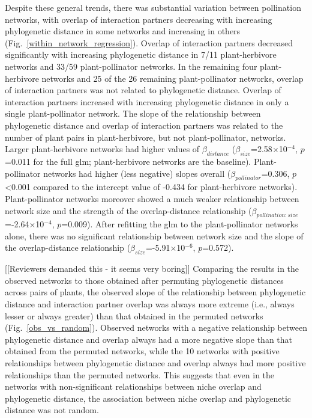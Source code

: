 \documentclass[12pt]{article}
\begin{document}
\begin{spacing}{1.5}
    Despite these general trends, there was substantial variation between 
    pollination networks, with overlap of interaction partners decreasing 
    with increasing phylogenetic distance in some networks and increasing in 
    others (Fig.~\ref{within_network_regression}). Overlap of interaction partners decreased significantly with increasing phylogenetic distance in 7/11 plant-herbivore networks and 33/59 plant-pollinator networks. In the remaining four plant-herbivore networks and 25 of the 26 remaining plant-pollinator networks, overlap of interaction partners was not related to phylogenetic distance. Overlap of interaction partners increased with increasing phylogenetic distance in only a single plant-pollinator network.%
    The slope of the relationship between phylogenetic distance and overlap of interaction partners was related to the number of plant pairs in plant-herbivore, but not plant-pollinator, networks. Larger plant-herbivore networks had higher values of $\beta_{distance}$ ($\beta_{size}$=2.58$\times$10$^{-4}$, $p$=0.011 for the full glm; plant-herbivore networks are the baseline). Plant-pollinator networks had higher (less negative) slopes overall ($\beta_{pollinator}$=0.306, $p$\textless0.001 compared to the intercept value of -0.434 for plant-herbivore networks). Plant-pollinator networks moreover showed a much weaker relationship between network size and the strength of the overlap-distance relationship ($\beta_{pollination:size}$=-2.64$\times$10$^{-4}$, $p$=0.009). After refitting the glm to the plant-pollinator networks alone, there was no significant relationship between network size and the slope of the overlap-distance relationship ($\beta_{size}$=-5.91$\times$10$^{-6}$, $p$=0.572).


    [[Reviewers demanded this - it seems very boring]]
    Comparing the results in the observed networks to those obtained after permuting phylogenetic distances across pairs of plants, the observed slope of the relationship between phylogenetic distance and interaction partner overlap was always more extreme (i.e., always lesser or always greater) than that obtained in the permuted networks (Fig.~\ref{obs_vs_random}). Observed networks with a negative relationship between phylogenetic distance and overlap always had a more negative slope than that obtained from the permuted networks, while the 10 networks with positive relationships between phylogenetic distance and overlap always had more positive relationships than the permuted networks. This suggests that even in the networks with non-significant relationships between niche overlap and phylogenetic distance, the association between niche overlap and phylogenetic distance was not random. 



\end{spacing}
\end{document}

